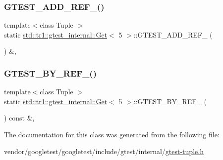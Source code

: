 \subsubsection{\texorpdfstring{G\+T\+E\+S\+T\+\_\+\+A\+D\+D\+\_\+\+R\+E\+F\+\_\+()}{GTEST\_ADD\_REF\_()}}
{\footnotesize\ttfamily template$<$class Tuple $>$ \\
static \hyperlink{classstd_1_1tr1_1_1gtest__internal_1_1_get}{std\+::tr1\+::gtest\+\_\+internal\+::\+Get}$<$ 5 $>$\+::G\+T\+E\+S\+T\+\_\+\+A\+D\+D\+\_\+\+R\+E\+F\+\_\+ (\begin{DoxyParamCaption}\item[{\hyperlink{gtest-tuple_8h_a1b7f133d8aa02e0b7afed7b66781eeb7}{G\+T\+E\+S\+T\+\_\+\+T\+U\+P\+L\+E\+\_\+\+E\+L\+E\+M\+E\+N\+T\+\_\+}(5, Tuple)}]{ }\end{DoxyParamCaption}) \&\hspace{0.3cm}{\ttfamily [inline]}, {\ttfamily [static]}}

\mbox{\label{classstd_1_1tr1_1_1gtest__internal_1_1_get_3_015_01_4_ae10fe16450db82d69b9a4d0b149ca75d}} 
\subsubsection{\texorpdfstring{G\+T\+E\+S\+T\+\_\+\+B\+Y\+\_\+\+R\+E\+F\+\_\+()}{GTEST\_BY\_REF\_()}}
{\footnotesize\ttfamily template$<$class Tuple $>$ \\
static \hyperlink{classstd_1_1tr1_1_1gtest__internal_1_1_get}{std\+::tr1\+::gtest\+\_\+internal\+::\+Get}$<$ 5 $>$\+::G\+T\+E\+S\+T\+\_\+\+B\+Y\+\_\+\+R\+E\+F\+\_\+ (\begin{DoxyParamCaption}\item[{\hyperlink{gtest-tuple_8h_a1b7f133d8aa02e0b7afed7b66781eeb7}{G\+T\+E\+S\+T\+\_\+\+T\+U\+P\+L\+E\+\_\+\+E\+L\+E\+M\+E\+N\+T\+\_\+}(5, Tuple)}]{ }\end{DoxyParamCaption}) const \&\hspace{0.3cm}{\ttfamily [inline]}, {\ttfamily [static]}}



The documentation for this class was generated from the following file\+:\begin{DoxyCompactItemize}
\item 
vendor/googletest/googletest/include/gtest/internal/\hyperlink{gtest-tuple_8h}{gtest-\/tuple.\+h}\end{DoxyCompactItemize}
